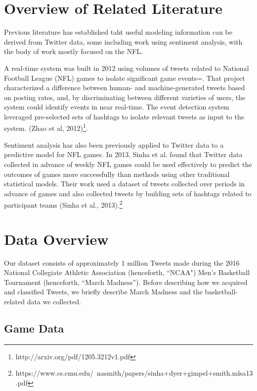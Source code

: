 \documentclass[12pt]{article}
\begin{document}
\begin{doublespacing}
\section{Overview of Related Literature}

Previous literature has established taht useful modeling information can be
derived from Twitter data, some including work using sentiment analysis, with the body of work mostly focused on the NFL. 

A real-time system was built in 2012 using volumes of 
tweets related to National Football League (NFL) games to 
isolate significant game
events=. That project characterized a 
difference between human- and machine-generated tweets
based on posting rates, and, by discriminating between 
different varieties of users, the system could 
identify events in near real-time. The event detection
system leveraged pre-selected sets of hashtags
to isolate relevant tweets as input to the system. (Zhao et al, 
2012)\footnote{http://arxiv.org/pdf/1205.3212v1.pdf}. 

Sentiment analysis has also been previously applied
to Twitter data to a predictive model for NFL games. 
In 2013, Sinha et al. found that Twitter data collected
in advance of weekly NFL games could be used effectively
to predict the outcomes of games more successfully than
methods using other traditional statistical models. Their
work used a dataset of tweets collected over periods 
in advance of games and also collected tweets by 
building sets of hashtags related to participant teams (Sinha et al., 2013).\footnote{https://www.cs.cmu.edu/~nasmith/papers/sinha+dyer+gimpel+smith.mlsa13.pdf}

\section{Data Overview}

Our dataset consists of approximately 1 million Tweets made during the 2016 National Collegiate Athletic Association (henceforth, ``NCAA") Men's Basketball Tournament (henceforth, ``March Madness''). Before describing how we acquired and classified Tweets, we briefly describe March Madness and the basketball-related data we collected. 

\subsection{Game Data}


\end{doublespacing}
\end{document}
